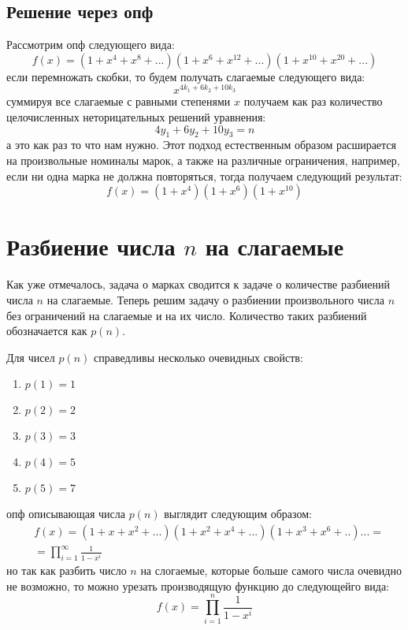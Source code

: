 \subsection{Решение через опф}

Рассмотрим опф следующего вида:
\[
	f\left(x\right) = \left(1 + x^4 + x^8 + ...\right)\left(1 + x^6 + x^{12} + ...\right)\left(1 + x^{10} + x^{20} + ...\right)
\]
если перемножать скобки, то будем получать слагаемые следующего вида:
\[
	x^{4k_1 + 6k_2 + 10k_3}
\]
суммируя все слагаемые с равными степенями $x$ получаем как раз количество целочисленных неторицательных решений уравнения:
\[
	4y_1 + 6y_2 + 10y_3 = n
\]
а это как раз то что нам нужно. Этот подход естественным образом расширается на произвольные номиналы марок, а также на различные ограничения, например, если ни одна марка не должна повторяться, тогда получаем следующий результат:
\[
	f\left(x\right) = \left(1+x^4\right)\left(1+x^6\right)\left(1+x^{10}\right)
\]

\section{Разбиение числа $n$ на слагаемые}

Как уже отмечалось, задача о марках сводится к задаче о количестве разбиений числа $n$ на слагаемые. Теперь решим задачу о разбиении произвольного числа $n$ без ограничений на слагаемые и на их число. Количество таких разбиений обозначается как $p\left(n\right)$.

Для чисел $p\left(n\right)$ справедливы несколько очевидных свойств:
\begin{enumerate}
\item $p\left(1\right) = 1$

\item $p\left(2\right) = 2$

\item $p\left(3\right) = 3$

\item $p\left(4\right) = 5$

\item $p\left(5\right) = 7$
\end{enumerate}

опф описывающая числа $p\left(n\right)$ выглядит следующим образом:
\begin{equation}
	\begin{split}
		& f\left(x\right) = \left(1+x+x^2+...\right)\left(1+x^2+x^4+...\right)\left(1+x^3+x^6+..\right) ... = \\
		& = \prod_{i=1}^\infty \frac{1}{1-x^i}
	\end{split}
\end{equation}
но так как разбить число $n$ на слогаемые, которые больше самого числа очевидно не возможно, то можно урезать производящую функцию до следующейго вида:
\begin{equation}
	f\left(x\right) = \prod_{i=1}^n\frac{1}{1-x^i}
\end{equation}

